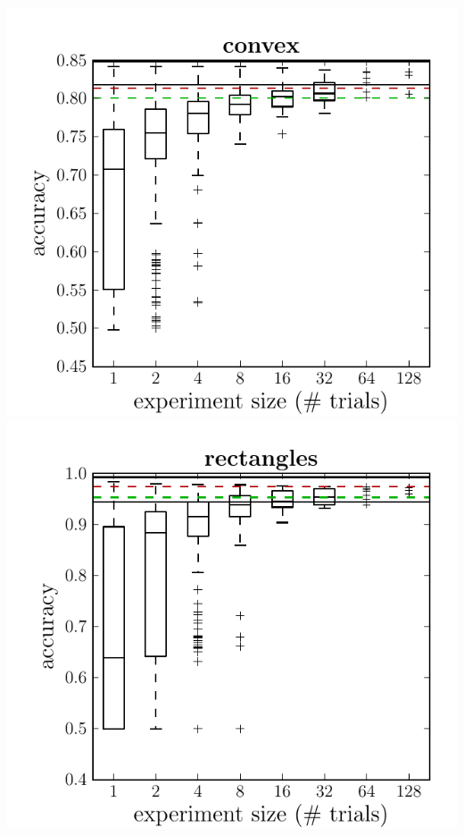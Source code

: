 \documentclass[12pt]{scrartcl}
\begin{document}
\includegraphics[scale=0.40]{figures/dbn_efficiency/dbn_efficiency_convex}
\includegraphics[scale=0.40]{figures/dbn_efficiency/dbn_efficiency_rectangles}
\end{document}
